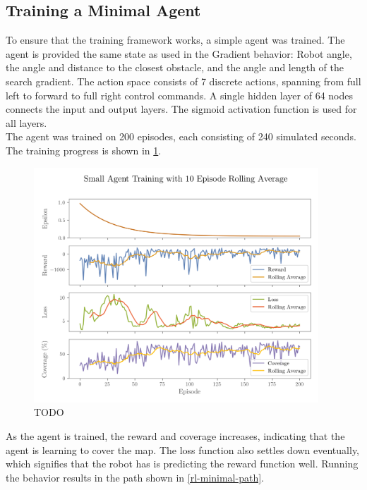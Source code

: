 \subsection{Training a Minimal Agent}
To ensure that the training framework works, a simple agent was trained. The agent is provided the same state as used in the Gradient behavior: Robot angle, the angle and distance to the closest obstacle, and the angle and length of the search gradient. The action space consists of 7 discrete actions, spanning from full left to forward to full right control commands. A single hidden layer of 64 nodes connects the input and output layers. The sigmoid activation function is used for all layers. \\

The agent was trained on 200 episodes, each consisting of 240 simulated seconds. The training progress is shown in \cref{fig:rl-minimal-training}.

\begin{figure}[H]
    \centering
    \includegraphics[width=0.95\textwidth]{figures/rl/small-search-agent-training.png}
    \caption{TODO}
    \label{fig:rl-minimal-training}
\end{figure}

As the agent is trained, the reward and coverage increases, indicating that the agent is learning to cover the map. The loss function also settles down eventually, which signifies that the robot has is predicting the reward function well. Running the behavior results in the path shown in \cref{rl-minimal-path}.

